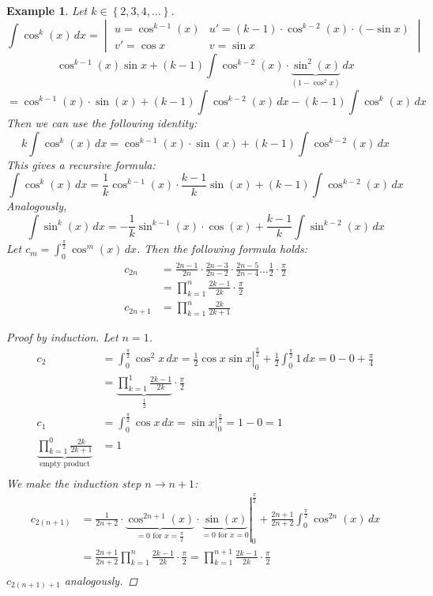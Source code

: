 \documentclass{article}
\newtheorem{example}{Example}  \numberwithin{example}{section}
\newcommand{\set}[1]{\left\{#1\right\}}
\begin{document}
\begin{example}
  Let $k \in \set{2,3,4,\ldots}$.
  \[
    \int \cos^k(x) \, dx =
    \begin{vmatrix}
      u = \cos^{k-1}(x) & u' = (k-1) \cdot \cos^{k-2}(x) \cdot (-\sin{x}) \\
      v' = \cos{x} & v = \sin{x}
    \end{vmatrix}
  \] \[
    \cos^{k-1}(x) \sin{x} + (k - 1) \int \cos^{k-2}(x) \cdot \underbrace{\sin^2(x)}_{(1 - \cos^2{x})} \, dx
  \] \[
    = \cos^{k-1}(x) \cdot \sin(x) + (k-1) \int \cos^{k-2}(x) \, dx - (k-1) \int \cos^k(x) \, dx
  \]
  Then we can use the following identity:
  \[
    k \int \cos^k(x) \, dx = \cos^{k-1}(x) \cdot \sin(x) + (k-1) \int \cos^{k-2}(x) \, dx
  \]
  This gives a recursive formula:
  \[
    \int \cos^k(x) \, dx = \frac1k \cos^{k-1}(x) \cdot \frac{k-1}{k} \sin(x) + (k-1) \int \cos^{k-2}(x) \, dx
  \]
  Analogously,
  \[ \int \sin^k(x) \, dx = -\frac1k \sin^{k-1}(x) \cdot \cos(x) + \frac{k-1}{k} \int \sin^{k-2}(x) \, dx \]
  Let $c_m = \int_0^{\frac\pi2} \cos^m(x) \, dx$. Then the following formula holds:
  \begin{align*}
    c_{2n} &= \frac{2n - 1}{2n} \cdot \frac{2n - 3}{2n - 2} \cdot \frac{2n - 5}{2n - 4} \ldots \frac{1}{2} \cdot \frac{\pi}{2} \\
      &= \prod_{k=1}^n \frac{2k - 1}{2k} \cdot \frac{\pi}{2} \\
    c_{2n+1} &= \prod_{k=1}^n \frac{2k}{2k + 1}
  \end{align*}
  \begin{proof}[Proof by induction]
    Let $n = 1$.
    \begin{align*}
      c_2 &= \int_0^{\frac\pi2} \cos^2{x} \, dx = \left.\frac12 \cos{x} \sin{x} \right|_0^{\frac\pi2} + \frac12 \int_0^{\frac\pi2} 1 \, dx = 0 - 0 + \frac\pi4 \\
          &= \underbrace{\prod_{k=1}^1 \frac{2k - 1}{2k}}_{\frac12} \cdot \frac\pi2 \\
      c_1 &= \int_0^{\frac\pi2} \cos{x} \, dx = \left. \sin{x} \right|_0^{\frac\pi2} = 1 - 0 = 1 \\
      \underbrace{\prod_{k=1}^0 \frac{2k}{2k + 1}}_{\text{empty product}} &= 1 \\
    \end{align*}
    We make the induction step $n \to n+1$:
    \begin{align*}
      c_{2(n+1)} &= \left.\frac{1}{2n+2} \cdot \underbrace{\cos^{2n+1}(x)}_{=0 \text{ for } x = \frac\pi2} \cdot \underbrace{\sin(x)}_{=0 \text{ for } x = 0}\right|_{0}^{\frac\pi2} + \frac{2n + 1}{2n + 2} \int_0^{\frac\pi2} \cos^{2n}(x) \, dx \\
        &= \frac{2n+1}{2n+2} \prod_{k=1}^n \frac{2k - 1}{2k} \cdot \frac\pi2 = \prod_{k=1}^{n+1} \frac{2k-1}{2k} \cdot \frac\pi2 \\
    \end{align*}
    $c_{2(n+1)+1}$ analogously.
  \end{proof}
\end{example}
\end{document}
